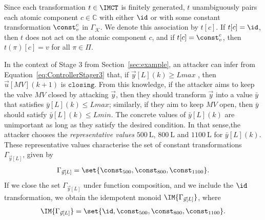 {\begin{definition}
Since each transformation $t\in \IMCT$ is finitely generated, $t$ unambiguously pairs each atomic component $c\in \mathbb{C}$ with either $\id$ or with some constant transformation $\const^{c}_{v}$ in $\Gamma_{\mathcal{K}}$.  We denote this association by $t[c]$. If $t[c]=\id$, then $t$ does not act on the atomic component $c$, and if $t[c]=\const^{c}_{v}$, then $t(\pi)[c]=v$ for all $\pi \in \Pi$.
\end{definition}
\begin{example}
  In the context of Stage 3 from Section~\ref{sec:example}, an attacker can infer from Equation~\ref{eq:ControllerStager3} that, if $\vec{y}[L](k)\geq Lmax$%
  , then $\vec{u}[MV](k+1)$ is $\texttt{closing}$. From this knowledge, if the attacker aims to keep the valve $MV$ closed by attacking $\vec{y}$, then they should transform $\vec{y}$ into a value $\bar{y}$ that satisfies $\bar{y}[L](k)\leq Lmax$; similarly, if they aim to keep $MV$ open, then $\bar{y}$ should satisfy $\bar{y}[L](k)\leq Lmin$. The concrete values of $\bar{y}[L](k)$ are unimportant as long as they satisfy the desired condition. In that sense,the attacker chooses the \emph{representative values} $500~\mathrm{L}$, $800~\mathrm{L}$ and $1100~\mathrm{L}$ for $\bar{y}[L](k)$. These representative values characterise the set of constant transformations $\Gamma_{\vec{y}[L]}$, given by
\begin{align}
  \Gamma_{\vec{y}[L]}=\set{\const_{500}, \const_{800},  \const_{1100}}.
\end{align}
If we close the set $\Gamma_{\vec{y}[L]}$ under function composition, and we include the $\id$ transformation, we obtain the idempotent monoid $\IM{\Gamma_{\vec{y}[L]}}$, where 
\begin{align*}
  \IM{\Gamma_{\vec{y}[L]}} =\set{\id, \const_{500}, \const_{800},\const_{1100}}.
\end{align*} 
\end{example}

}
